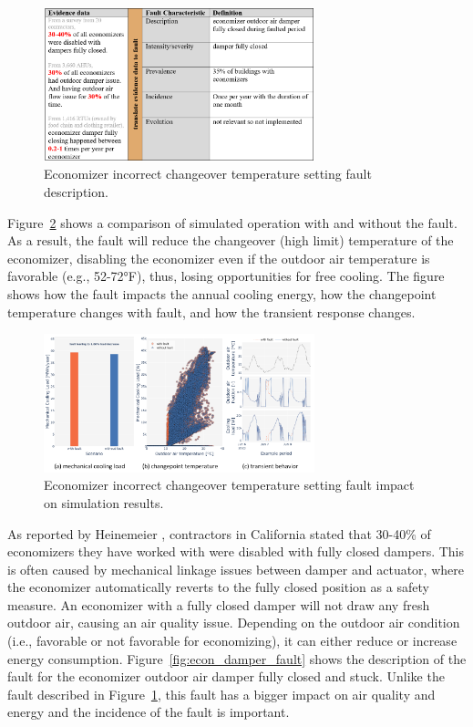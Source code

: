 \begin{figure}
  \centering \includegraphics[width=0.7\textwidth]{figures/econ_temp_fault.png}
  \caption{Economizer incorrect changeover temperature setting fault description.}
  \label{fig:econ_temp_fault}
\end{figure}

Figure~\ref{fig:econ_temp_fault_single_model} shows a comparison of simulated operation with and without the fault. As a result, the fault will reduce the changeover (high limit) temperature of the economizer, disabling the economizer even if the outdoor air temperature is favorable (e.g., 52-72°F), thus, losing opportunities for free cooling. The figure shows how the fault impacts the annual cooling energy, how the changepoint temperature changes with fault, and how the transient response changes.

\begin{figure}
  \centering \includegraphics[width=0.7\textwidth]{figures/econ_temp_fault_single_model.png}
  \caption{Economizer incorrect changeover temperature setting fault impact on simulation results.}
  \label{fig:econ_temp_fault_single_model}
\end{figure}

As reported by Heinemeier \citep{heinemeier2014free}, contractors in California stated that 30-40\% of economizers they have worked with were disabled with fully closed dampers. This is often caused by mechanical linkage issues between damper and actuator, where the economizer automatically reverts to the fully closed position as a safety measure. An economizer with a fully closed damper will not draw any fresh outdoor air, causing an air quality issue. Depending on the outdoor air condition (i.e., favorable or not favorable for economizing), it can either reduce or increase energy consumption. Figure~\ref{fig:econ_damper_fault} shows the description of the fault for the economizer outdoor air damper fully closed and stuck. Unlike the fault described in Figure~\ref{fig:econ_temp_fault}, this fault has a bigger impact on air quality and energy and the incidence of the fault is important.

